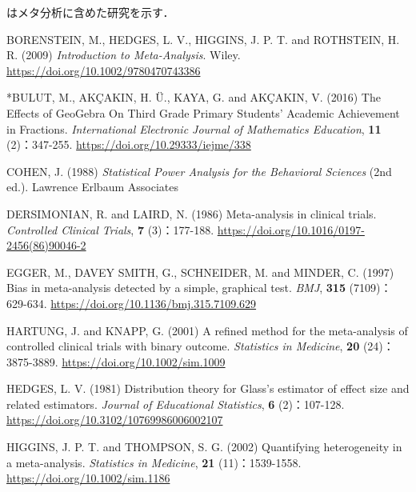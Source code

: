 \documentclass[
  lualatex, ja=standard, paper={182mm,257mm}, twocolumn, fontsize=8.5pt, baselineskip=13.5pt,
  line_length=24zw, column_gap=6.1mm, number_of_lines=45, head_space=24.5mm, gutter=16.25mm
]{jlreq}
\newcommand{\chapspaced}[1]{\par\vspace{13.5pt}\needspace{4\baselineskip}{\centering\gtfamily\bfseries #1\par}\nopagebreak}
\begin{document}
\chapspaced{参考文献}
{\noindent * はメタ分析に含めた研究を示す．\par}
{\small
\par\noindent{}\zw{} BORENSTEIN, M., HEDGES, L. V., HIGGINS, J. P. T. and ROTHSTEIN, H. R. (2009) \textit{Introduction to Meta-Analysis}. Wiley. \url{https://doi.org/10.1002/9780470743386}\par
\par\noindent{}\zw{} *BULUT, M., AKÇAKIN, H. Ü., KAYA, G. and AKÇAKIN, V. (2016) The Effects of GeoGebra On Third Grade Primary Students’ Academic Achievement in Fractions. \textit{International Electronic Journal of Mathematics Education}, \textbf{11} (2)：347-255. \url{https://doi.org/10.29333/iejme/338}\par
\par\noindent{}\zw{} COHEN, J. (1988) \textit{Statistical Power Analysis for the Behavioral Sciences} (2nd ed.). Lawrence Erlbaum Associates\par
\par\noindent{}\zw{} DERSIMONIAN, R. and LAIRD, N. (1986) Meta-analysis in clinical trials. \textit{Controlled Clinical Trials}, \textbf{7} (3)：177-188. \url{https://doi.org/10.1016/0197-2456(86)90046-2}\par
\par\noindent{}\zw{} EGGER, M., DAVEY SMITH, G., SCHNEIDER, M. and MINDER, C. (1997) Bias in meta-analysis detected by a simple, graphical test. \textit{BMJ}, \textbf{315} (7109)：629-634. \url{https://doi.org/10.1136/bmj.315.7109.629}\par
\par\noindent{}\zw{} HARTUNG, J. and KNAPP, G. (2001) A refined method for the meta-analysis of controlled clinical trials with binary outcome. \textit{Statistics in Medicine}, \textbf{20} (24)：3875-3889. \url{https://doi.org/10.1002/sim.1009}\par
\par\noindent{}\zw{} HEDGES, L. V. (1981) Distribution theory for Glass's estimator of effect size and related estimators. \textit{Journal of Educational Statistics}, \textbf{6} (2)：107-128. \url{https://doi.org/10.3102/10769986006002107}\par
\par\noindent{}\zw{} HIGGINS, J. P. T. and THOMPSON, S. G. (2002) Quantifying heterogeneity in a meta-analysis. \textit{Statistics in Medicine}, \textbf{21} (11)：1539-1558. \url{https://doi.org/10.1002/sim.1186}\par
}
\end{document}
